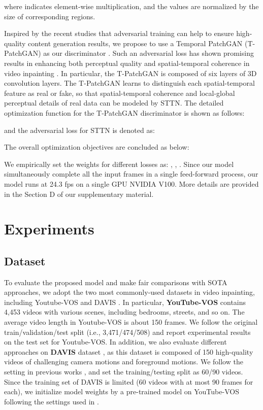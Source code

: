 \documentclass[runningheads]{llncs}
\begin{document}
where  indicates element-wise multiplication, and the values are normalized by the size of corresponding regions. 

Inspired by the recent studies that adversarial training can help to ensure high-quality content generation results, we propose to use a Temporal PatchGAN (T-PatchGAN) as our discriminator \cite{chang2019free,chang2019learnable,yang2020learning,zeng2019learning}. 
Such an adversarial loss has shown promising results in enhancing both perceptual quality and spatial-temporal coherence in video inpainting \cite{chang2019free,chang2019learnable}. 
In particular, the T-PatchGAN is composed of six layers of 3D convolution layers. The T-PatchGAN learns to distinguish each spatial-temporal feature as real or fake, so that spatial-temporal coherence and local-global perceptual details of real data can be modeled by STTN. 
The detailed optimization function for the T-PatchGAN discriminator is shown as follows: 
 
and the adversarial loss for STTN is denoted as:

The overall optimization objectives are concluded as below:
  

We empirically set the weights for different losses as: , , . Since our model simultaneously complete all the input frames in a single feed-forward process, our model runs at 24.3 fps on a single GPU NVIDIA V100. More details are provided in the Section D of our supplementary material.


\section{Experiments}
\label{sec:exp}

\subsection{Dataset} 
\label{subsec:data}

To evaluate the proposed model and make fair comparisons with SOTA approaches, we adopt the two most commonly-used datasets in video inpainting, including Youtube-VOS \cite{xu2018youtube} and DAVIS \cite{caelles20182018}. 
In particular, \textbf{YouTube-VOS} contains 4,453 videos with various scenes, including bedrooms, streets, and so on. The average video length in Youtube-VOS is about 150 frames. We follow the original train/validation/test split (i.e., 3,471/474/508) and report experimental results on the test set for Youtube-VOS. 
In addition, we also evaluate different approaches on 
\textbf{DAVIS} dataset \cite{caelles20182018}, as this dataset is composed of 150 high-quality videos of challenging camera motions and foreground motions. We follow the setting in previous works \cite{kim2019deep,xu2019deep}, and set the training/testing split as 60/90 videos. Since the training set of DAVIS is limited (60 videos with at most 90 frames for each), we initialize model weights by a pre-trained model on YouTube-VOS following the settings used in \cite{kim2019deep,xu2019deep}.
\end{document}
